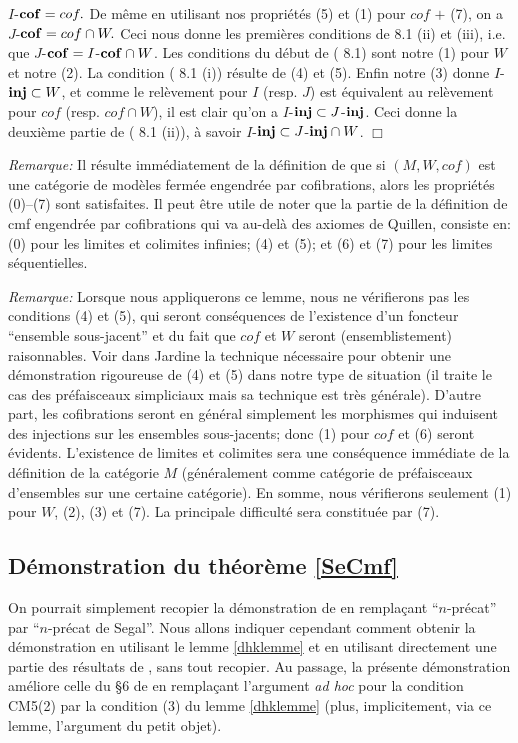 \documentclass[12pt]{article}
\newcommand{\subnumero}[1]{\subsection*{#1}\phantomsection\addcontentsline{toc}{subsection}{#1}}
\newcommand{\eop}{\hfill $\Box$\vspace{.1in}}
\begin{document}
$
I$-${\bf cof}= cof.
$
De m\^eme en utilisant nos propri\'et\'es (5) et (1) pour $cof$ $+$ (7), on a
$
J$-${\bf cof}= cof \cap W.
$
Ceci nous donne les premi\`eres conditions de \cite{DHK} 8.1 (ii) et (iii),
i.e. que $J$-${\bf cof}=I$-${\bf cof}\cap W$.  Les conditions du d\'ebut de
(\cite{DHK}
8.1) sont notre (1) pour $W$ et notre (2). La condition  (\cite{DHK} 8.1
(i)) r\'esulte de
(4) et (5).  Enfin notre (3) donne $I$-${\bf inj} \subset W$,
et comme le rel\`evement pour $I$ (resp. $J$) est \'equivalent au rel\`evement
pour $cof$ (resp. $cof \cap W$), il est clair qu'on a
$I$-${\bf inj} \subset J$-${\bf inj}$. Ceci donne la deuxi\`eme partie de
(\cite{DHK} 8.1 (ii)), \`a savoir $I$-${\bf inj} \subset J$-${\bf inj} \cap W$.
\eop

{\em Remarque:} Il r\'esulte imm\'ediatement de la d\'efinition de
\cite{Hirschhorn}
\cite{DHK} que si $(M, W, cof)$ est une cat\'egorie de mod\`eles
ferm\'ee engendr\'ee par cofibrations, alors les propri\'et\'es (0)--(7) sont
satisfaites.
Il peut \^etre utile de noter que la partie de la  d\'efinition de cmf
engendr\'ee par cofibrations
qui va au-del\`a
des axiomes de  Quillen, consiste en: (0) pour les limites et colimites
infinies; (4) et (5); et
(6) et (7) pour les limites s\'equentielles.


{\em Remarque:} Lorsque nous appliquerons ce lemme, nous ne v\'erifierons
pas les
conditions (4) et (5), qui seront cons\'equences de l'existence d'un
foncteur ``ensemble sous-jacent'' et du fait que $cof$ et $W$ seront
(ensemblistement)
raisonnables.
Voir dans Jardine \cite{Jardine} la technique n\'ecessaire pour obtenir une
d\'emonstration
rigoureuse de (4) et (5) dans notre type de situation (il traite le cas des
pr\'efaisceaux
simpliciaux mais sa technique est tr\`es g\'en\'erale).
D'autre part, les cofibrations seront en
g\'en\'eral simplement les morphismes qui induisent des injections sur les
ensembles sous-jacents; donc (1) pour $cof$ et (6) seront \'evidents.
L'existence de limites et colimites sera une cons\'equence imm\'ediate de la
d\'efinition de la cat\'egorie $M$ (g\'en\'eralement comme cat\'egorie de
pr\'efaisceaux d'ensembles sur une certaine cat\'egorie).  En somme, nous
v\'erifierons seulement (1) pour $W$, (2), (3) et (7). La principale
difficult\'e sera
constitu\'ee par (7).



\subnumero{D\'emonstration du th\'eor\`eme \ref{SeCmf}}
On pourrait simplement recopier la d\'emonstration de \cite{nCAT}
en rempla\c{c}ant ``$n$-pr\'ecat'' par ``$n$-pr\'ecat de Segal''. Nous allons
indiquer cependant comment obtenir la d\'emonstration en utilisant le lemme
\ref{dhklemme} et en utilisant directement une partie des r\'esultats de
\cite{nCAT}, sans tout recopier. Au passage, la pr\'esente
d\'emonstration am\'eliore celle du \S 6 de \cite{nCAT} en rempla\c{c}ant
l'argument {\em ad hoc} pour la condition  CM5(2) par la condition (3) du lemme
\ref{dhklemme} (plus, implicitement, via ce lemme, l'argument du petit objet).
\end{document}

